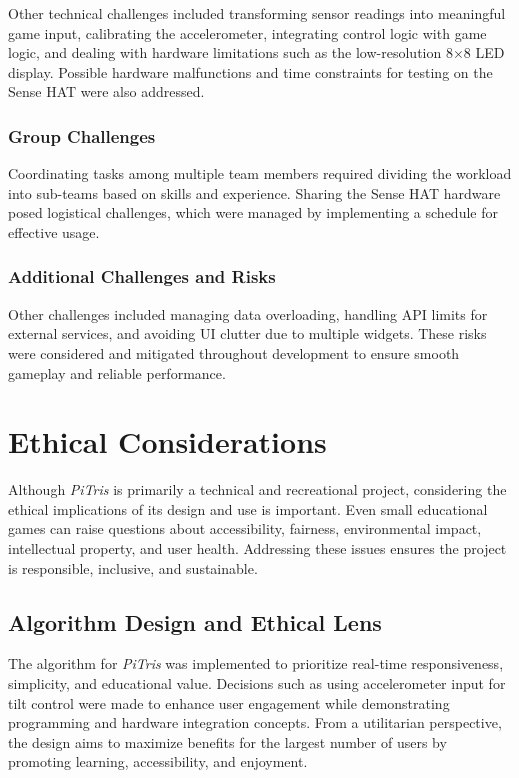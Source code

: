 \documentclass[12pt]{report}
\begin{document}
Other technical challenges included transforming sensor readings into meaningful game input, calibrating the accelerometer, integrating control logic with game logic, and dealing with hardware limitations such as the low-resolution 8$\times$8 LED display. Possible hardware malfunctions and time constraints for testing on the Sense HAT were also addressed.

\subsection{Group Challenges}

Coordinating tasks among multiple team members required dividing the workload into sub-teams based on skills and experience. Sharing the Sense HAT hardware posed logistical challenges, which were managed by implementing a schedule for effective usage.

\subsection{Additional Challenges and Risks}

Other challenges included managing data overloading, handling API limits for external services, and avoiding UI clutter due to multiple widgets. These risks were considered and mitigated throughout development to ensure smooth gameplay and reliable performance.

\chapter{Ethical Considerations}

Although \textit{PiTris} is primarily a technical and recreational project, considering the ethical implications of its design and use is important. Even small educational games can raise questions about accessibility, fairness, environmental impact, intellectual property, and user health. Addressing these issues ensures the project is responsible, inclusive, and sustainable.

\section{Algorithm Design and Ethical Lens}
The algorithm for \textit{PiTris} was implemented to prioritize real-time responsiveness, simplicity, and educational value. Decisions such as using accelerometer input for tilt control were made to enhance user engagement while demonstrating programming and hardware integration concepts. From a utilitarian perspective, the design aims to maximize benefits for the largest number of users by promoting learning, accessibility, and enjoyment.
\end{document}
